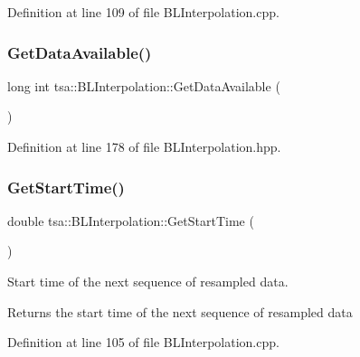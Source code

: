 Definition at line 109 of file B\+L\+Interpolation.\+cpp.

\mbox{\label{classtsa_1_1_b_l_interpolation_a10f95a5ac0e7cc6981d30ed420404a3d}} 
\subsubsection{\texorpdfstring{Get\+Data\+Available()}{GetDataAvailable()}}
{\footnotesize\ttfamily long int tsa\+::\+B\+L\+Interpolation\+::\+Get\+Data\+Available (\begin{DoxyParamCaption}{ }\end{DoxyParamCaption})\hspace{0.3cm}{\ttfamily [inline]}}



Definition at line 178 of file B\+L\+Interpolation.\+hpp.

\mbox{\label{classtsa_1_1_b_l_interpolation_a4fa7c4bfb9e12a3eb6767fc6b128093c}} 
\subsubsection{\texorpdfstring{Get\+Start\+Time()}{GetStartTime()}}
{\footnotesize\ttfamily double tsa\+::\+B\+L\+Interpolation\+::\+Get\+Start\+Time (\begin{DoxyParamCaption}{ }\end{DoxyParamCaption})}

Start time of the next sequence of resampled data.

\begin{DoxyReturn}{Returns}
the start time of the next sequence of resampled data 
\end{DoxyReturn}


Definition at line 105 of file B\+L\+Interpolation.\+cpp.

\mbox{\label{classtsa_1_1_b_l_interpolation_aff26a1c884d2733cebf280a556987e51}} 
